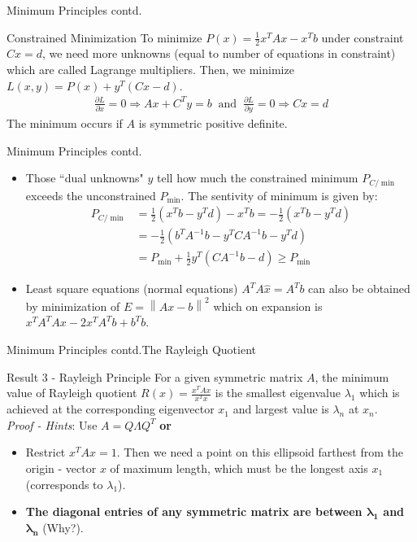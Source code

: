 \documentclass{beamer}
\begin{document}
\begin{frame}{Minimum Principles contd.}{}
\begin{exampleblock}{Constrained Minimization}
To minimize $P(x) = \frac{1}{2}x^TAx - x^Tb$ under constraint $Cx = d$, we need more unknowns (equal to number of equations in constraint) which are called Lagrange multipliers. Then, we minimize $L(x,y) = P(x) + y^T(Cx-d)$.
\begin{align*}
    \frac{\partial L}{\partial x} = 0 \Rightarrow Ax + C^Ty = b \ \text{ and }\  \frac{\partial L}{\partial y} = 0 \Rightarrow Cx = d
\end{align*}
The minimum occurs if $A$ is symmetric positive definite.
\end{exampleblock}
\end{frame}

\begin{frame}{Minimum Principles contd.}
\begin{itemize}
    \item {
        Those ``dual unknowns" $y$ tell how much the constrained minimum $P_{C/\min}$ exceeds the unconstrained $P_{\min}$. The sentivity of minimum is given by:
        \begin{align*}
        P_{C/\min} &= \frac{1}{2}(x^Tb - y^Td)-x^Tb = -\frac{1}{2}(x^Tb-y^Td)\\
        &= -\frac{1}{2}(b^TA^{-1}b - y^TCA^{-1}b - y^Td)\\
        &=P_{\min} + \frac{1}{2}y^T(CA^{-1}b - d) \geq P_{\min}
        \end{align*}
    }
    \item Least square equations (normal equations) $A^TA\hat{x} = A^Tb$ can also be obtained by minimization of $E = \left\|Ax-b\right\|^2$ which on expansion is $x^TA^TAx - 2x^TA^Tb + b^Tb$.
\end{itemize}
\end{frame}

\begin{frame}{Minimum Principles contd.}{The Rayleigh Quotient}
\begin{block}{Result 3 - Rayleigh Principle}
For a given symmetric matrix $A$, the minimum value of Rayleigh quotient $R(x) = \frac{x^TAx}{x^Tx}$ is the smallest eigenvalue $\lambda_1$ which is achieved at the corresponding eigenvector $x_1$ and largest value is $\lambda_n$ at $x_n$.\\
\textit{Proof - Hints}: Use $A = Q\Lambda Q^T$ \textbf{or}
\begin{itemize}
    \item Restrict $x^TAx = 1$. Then we need a point on this ellipsoid farthest from the origin - vector $x$ of maximum length, which must be the longest axis $x_1$ (corresponds to $\lambda_1$).
    \item \textbf{The diagonal entries of any symmetric matrix are between $\mathbf{\lambda_1}$ and $\mathbf{\lambda_n}$} (Why?).
\end{itemize}
\end{block}
\end{frame}
\end{document}
